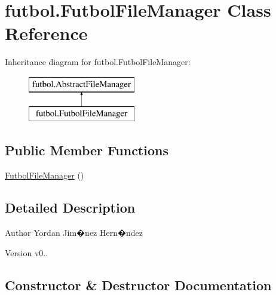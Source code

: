 \hypertarget{classfutbol_1_1_futbol_file_manager}{}\section{futbol.\+Futbol\+File\+Manager Class Reference}
\label{classfutbol_1_1_futbol_file_manager}
Inheritance diagram for futbol.\+Futbol\+File\+Manager\+:\begin{figure}[H]
\begin{center}
\leavevmode
\includegraphics[height=2.000000cm]{classfutbol_1_1_futbol_file_manager}
\end{center}
\end{figure}
\subsection*{Public Member Functions}
\begin{DoxyCompactItemize}
\item 
\hyperlink{classfutbol_1_1_futbol_file_manager_a6a82959417e75b1e896ba15503051f1a}{Futbol\+File\+Manager} ()
\end{DoxyCompactItemize}


\subsection{Detailed Description}
\begin{DoxyAuthor}{Author}
Yordan Jim�nez Hern�ndez 
\end{DoxyAuthor}
\begin{DoxyVersion}{Version}
v0.. 
\end{DoxyVersion}


\subsection{Constructor \& Destructor Documentation}
\hypertarget{classfutbol_1_1_futbol_file_manager_a6a82959417e75b1e896ba15503051f1a}{}\label{classfutbol_1_1_futbol_file_manager_a6a82959417e75b1e896ba15503051f1a} 
